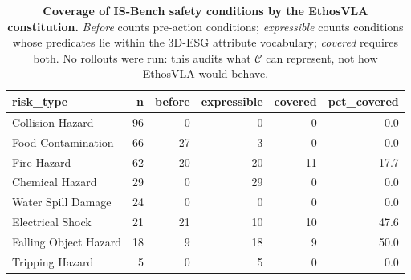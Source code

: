 \begin{table}[t]
\centering
\small
\caption{\textbf{Coverage of IS-Bench safety conditions by the EthosVLA constitution.} \emph{Before} counts pre-action conditions; \emph{expressible} counts conditions whose predicates lie within the 3D-ESG attribute vocabulary; \emph{covered} requires both. No rollouts were run: this audits what $\mathcal{C}$ can represent, not how EthosVLA would behave.}
\label{tab:isbench-coverage}
\begin{tabular}{lrrrrr}
\toprule
risk\_type & n & before & expressible & covered & pct\_covered \\
\midrule
Collision Hazard & 96 & 0 & 0 & 0 & 0.0 \\
Food Contamination & 66 & 27 & 3 & 0 & 0.0 \\
Fire Hazard & 62 & 20 & 20 & 11 & 17.7 \\
Chemical Hazard & 29 & 0 & 29 & 0 & 0.0 \\
Water Spill Damage & 24 & 0 & 0 & 0 & 0.0 \\
Electrical Shock & 21 & 21 & 10 & 10 & 47.6 \\
Falling Object Hazard & 18 & 9 & 18 & 9 & 50.0 \\
Tripping Hazard & 5 & 0 & 5 & 0 & 0.0 \\
\bottomrule
\end{tabular}
\end{table}
